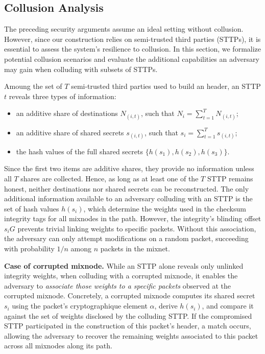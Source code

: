 
\subsection{Collusion Analysis}\label{sec:collusion}

The preceding security arguments assume an ideal setting without collusion.
However, since our construction relies on semi-trusted third parties (STTPs), it is essential to assess the system's resilience to collusion. 
In this section, we formalize potential collusion scenarios and evaluate the additional capabilities an adversary may gain when colluding with subsets of STTPs.
\newline

Amoung the set of $T$ semi-trusted third parties used to build an header, an STTP $t$ reveals three types of information:  
\begin{itemize}
  \item an additive share of destinations $N_{(i,t)}$, such that\newline 
  $N_i = \sum_{t=1}^T N_{(i,t)}$;  
  \item an additive share of shared secrets $s_{(i,t)}$, such that\newline 
  $s_i = \sum_{t=1}^T s_{(i,t)}$;
  \item the hash values of the full shared secrets $\{h(s_1), h(s_2), h(s_3)\}$.\newline 
\end{itemize}

Since the first two items are additive shares, they provide no information unless all $T$ shares are collected.
Hence, as long as at least one of the $T$ STTP remains honest, neither destinations nor shared secrets can be reconstructed.
The only additional information available to an adversary colluding with an STTP is the set of hash values $h(s_i)$, which determine the weights used in the checksum integrity tags for all mixnodes in the path.  
However, the integrity's blinding offset $s_i G$ prevents trivial linking weights to specific packets.
Without this association, the adversary can only attempt modifications on a random packet, succeeding with probability $1/n$ among $n$ packets in the mixnet.
\newline

\noindent\textbf{Case of corrupted mixnode.}  
While an STTP alone reveals only unlinked integrity weights, when colluding with a corrupted mixnode, it enables the adversary to \emph{associate those weights to a specific packets} observed at the corrupted mixnode.  
Concretely, a corrupted mixnode computes its shared secret $s_i$ using the packet's cryptographique element $\alpha$, derive $h(s_i)$, and compare it against the set of weights disclosed by the colluding STTP.
If the compromised STTP participated in the construction of this packet's header, a match occurs, allowing the adversary to recover the remaining weights associated to this packet across all mixnodes along its path.

